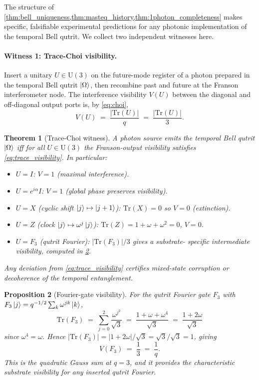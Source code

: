 ﻿\documentclass[12pt]{article}
\newtheorem{theorem}{Theorem}[section]
\newtheorem{proposition}[theorem]{Proposition}
\begin{document}
The structure of \cref{thm:bell_uniqueness,thm:masteq_history,thm:1photon_completeness}
makes specific, falsifiable experimental predictions for any photonic
implementation of the temporal Bell qutrit.  We collect two independent
witnesses here.

\paragraph{Witness 1: Trace-Choi visibility.}
Insert a unitary $U \in \mathrm{U}(3)$ on the future-mode register of a
photon prepared in the temporal Bell qutrit $\ket{\Omega}$, then recombine
past and future at the Franson interferometer node.  The interference
visibility $V(U)$ between the diagonal and off-diagonal output ports is, by
\eqref{eq:choi},
\begin{equation}
  V(U) \;=\; \frac{|\mathrm{Tr}(U)|}{q} \;=\; \frac{|\mathrm{Tr}(U)|}{3}.
  \label{eq:trace_visibility}
\end{equation}

\begin{theorem}[Trace-Choi witness]\label{thm:trace_witness}
A photon source emits the temporal Bell qutrit $\ket{\Omega}$ \emph{iff} for
all $U \in \mathrm{U}(3)$ the Franson-output visibility satisfies
\eqref{eq:trace_visibility}.  In particular:
\begin{itemize}[noitemsep]
  \item $U = I$: $V = 1$ (maximal interference).
  \item $U = e^{i\alpha}I$: $V = 1$ (global phase preserves visibility).
  \item $U = X$ (cyclic shift $\ket{j}\mapsto\ket{j+1}$): $\mathrm{Tr}(X) = 0$
    so $V = 0$ (extinction).
  \item $U = Z$ (clock $\ket{j}\mapsto\omega^j\ket{j}$):
    $\mathrm{Tr}(Z) = 1+\omega+\omega^2 = 0$, $V = 0$.
  \item $U = F_3$ (qutrit Fourier): $|\mathrm{Tr}(F_3)|/3$ gives a substrate-
    specific intermediate visibility, computed in \cref{prop:F3vis}.
\end{itemize}
Any deviation from \eqref{eq:trace_visibility} certifies mixed-state
corruption or decoherence of the temporal entanglement.
\end{theorem}

\begin{proposition}[Fourier-gate visibility]\label{prop:F3vis}
For the qutrit Fourier gate $F_3$ with $F_3\ket{j} = q^{-1/2}\sum_k\omega^{jk}\ket{k}$,
\[
  \mathrm{Tr}(F_3) \;=\; \sum_{j=0}^{2} \frac{\omega^{j^2}}{\sqrt 3}
  \;=\; \frac{1 + \omega + \omega^4}{\sqrt 3}
  \;=\; \frac{1 + 2\omega}{\sqrt 3}
\]
since $\omega^4 = \omega$.  Hence
$|\mathrm{Tr}(F_3)| = |1+2\omega|/\sqrt 3 = \sqrt{3}/\sqrt 3 = 1$, giving
\begin{equation}
  V(F_3) \;=\; \frac{1}{3} \;=\; \frac{1}{q}.
\end{equation}
This is the \emph{quadratic Gauss sum} at $q=3$, and it provides the
characteristic substrate visibility for any inserted qutrit Fourier.
\end{proposition}
\end{document}
